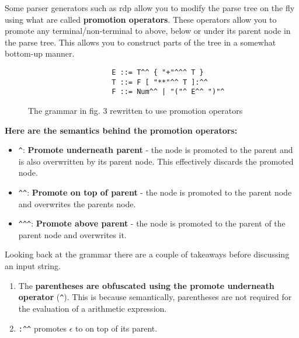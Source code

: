 \documentclass[12pt, letterpaper]{article}
\theoremstyle{definition}
\begin{document}
Some parser generators such as rdp\textsuperscript{\cite{johnstone_scott_1997}} allow you to modify the parse tree on the fly using what are called \textbf{promotion operators}. These operators allow you to promote any terminal/non-terminal to above, below or under its parent node in the parse tree. This allows you to construct parts of the tree in a somewhat bottom-up manner.

\begin{figure}[H]
    \begin{center}
        \begin{verbatim}
                    E ::= T^^ { "+"^^^ T }
                    T ::= F [ "**"^^ T ]:^^
                    F ::= Num^^ | "("^ E^^ ")"^
        \end{verbatim}
    \end{center}
    \vspace{-1.5em}
    \caption{The grammar in fig. 3 rewritten to use promotion operators}
\end{figure}

\begin{center}
    \textbf{Here are the semantics behind the promotion operators:}
    \begin{itemize}
        \item \verb|^|: \textbf{Promote underneath parent} - the node is promoted to the parent and is also overwritten by its parent node. This effectively discards the promoted node.
        \item \verb|^^|: \textbf{Promote on top of parent} - the node is promoted to the parent node and overwrites the parents node.
        \item \verb|^^^|: \textbf{Promote above parent} - the node is promoted to the parent of the parent node and overwrites it.
    \end{itemize}
\end{center}

Looking back at the grammar there are a couple of takeaways before discussing an input string.

\begin{enumerate}
    \item The \textbf{parentheses are obfuscated using the promote underneath operator} (\verb|^|). This is because semantically, parentheses are not required for the evaluation of a arithmetic expression.
    \item \verb|:^^| promotes $\epsilon$ to on top of its parent.
\end{enumerate}
\end{document}
